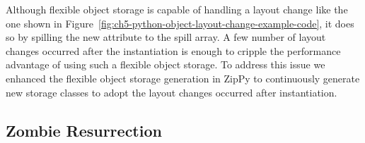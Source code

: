 Although flexible object storage is capable of handling a layout change like the one shown in Figure~\ref{fig:ch5-python-object-layout-change-example-code}, it does so by spilling the new attribute to the spill array.
A few number of layout changes occurred after the instantiation is enough to cripple the performance advantage of using such a flexible object storage.
To address this issue we enhanced the flexible object storage generation in ZipPy to continuously generate new storage classes to adopt the layout changes occurred after instantiation.



\subsection{Zombie Resurrection}
\label{sec:ch5-zombie-resurrection}